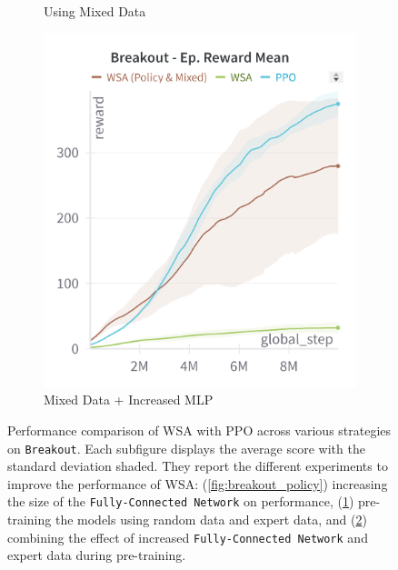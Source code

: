 \begin{figure}[ht]
\begin{subfigure}[b]{0.32\textwidth}
        \caption{Using Mixed Data}
        \label{fig:breakout_expert}
    \end{subfigure}
    \hfill
    \begin{subfigure}[b]{0.32\textwidth}
        \centering
        \includegraphics[width=\textwidth]{images/breakout_policy_mixed.png}
        \caption{Mixed Data + Increased MLP}
        \label{fig:breakout_expert_policy}
    \end{subfigure}
    \caption{Performance comparison of WSA with PPO across various strategies on \texttt{Breakout}. Each subfigure displays the average score with the standard deviation shaded. They report the different experiments to improve the performance of WSA: (\ref{fig:breakout_policy}) increasing the size of the \texttt{Fully-Connected Network} on performance, (\ref{fig:breakout_expert}) pre-training the models using random data and expert data, and (\ref{fig:breakout_expert_policy}) combining the effect of increased \texttt{Fully-Connected Network} and expert data during pre-training.}
    \label{fig:breakout_study}
\end{figure}



